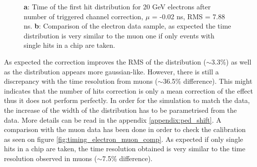 \documentclass[twoside,a4paper,11pt]{article}
\begin{document}
\begin{figure}[htbp]
	\hfill
	\caption[]{\textbf{a}: Time of the first hit distribution for 20 GeV electrons after number of triggered channel correction, $\mu$ = -0.02 ns, RMS = 7.88 ns. \textbf{b}: Comparison of the electron data sample, as expected the time distribution is very similar to the muon one if only events with single hits in a chip are taken.}
\end{figure}
As expected the correction improves the RMS of the distribution ($\sim$3.3\%) as well as the distribution appears more gaussian-like. However, there is still a discrepancy with the time resolution from muons ($\sim$36.5\% difference). This might indicates that the number of hits correction is only a mean correction of the effect thus it does not perform perfectly. In order for the simulation to match the data, the increase of the width of the distribution has to be parametrised from the data. More details can be read in the appendix \ref{appendix:ped_shift}. A comparison with the muon data has been done in order to check the calibration as seen on figure \ref{fig:timing_electron_muon_comp}. As expected if only single hits in a chip are taken, the time resolution obtained is very similar to the time resolution observed in muons ($\sim$7.5\% difference).
\end{document}
